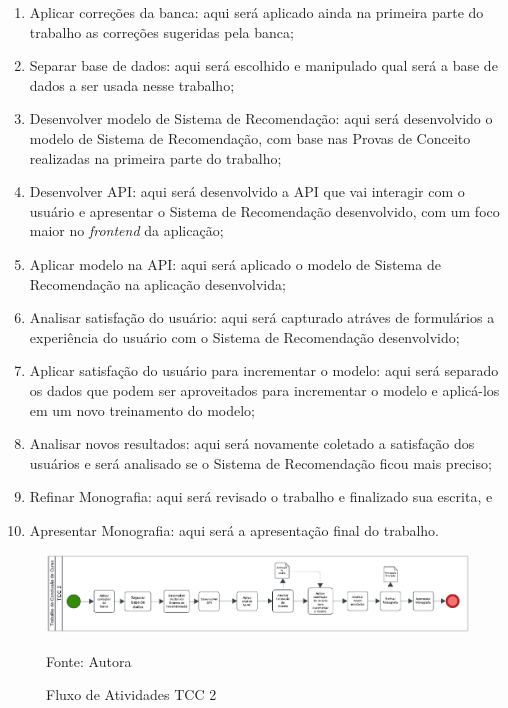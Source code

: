 \begin{enumerate}
    \item Aplicar correções da banca: aqui será aplicado ainda na primeira parte do trabalho as correções sugeridas pela banca;
    \item Separar base de dados: aqui será escolhido e manipulado qual será a base de dados a ser usada nesse trabalho;
    \item Desenvolver modelo de Sistema de Recomendação: aqui será desenvolvido o modelo de Sistema de Recomendação, com base
    nas Provas de Conceito realizadas na primeira parte do trabalho;
    \item Desenvolver API: aqui será desenvolvido a API que vai interagir com o usuário e apresentar o Sistema de Recomendação
    desenvolvido, com um foco maior no \textit{frontend} da aplicação;
    \item Aplicar modelo na API: aqui será aplicado o modelo de Sistema de Recomendação na aplicação desenvolvida;
    \item Analisar satisfação do usuário: aqui será capturado atráves de formulários a experiência do usuário com o Sistema de
    Recomendação desenvolvido;
    \item Aplicar satisfação do usuário para incrementar o modelo: aqui será separado os dados que podem ser aproveitados para
    incrementar o modelo e aplicá-los em um novo treinamento do modelo;
    \item Analisar novos resultados: aqui será novamente coletado a satisfação dos usuários e será analisado se o Sistema 
    de Recomendação ficou mais preciso;
    \item Refinar Monografia: aqui será revisado o trabalho e finalizado sua escrita, e
    \item Apresentar Monografia: aqui será a apresentação final do trabalho.
\end{enumerate}

\begin{figure}[H]
    \centering
    \caption{Fluxo de Atividades TCC 2}
    \label{fig:bpmnTcc2}
    
    \vspace{2pt} %
    
    \includegraphics[width=1.0\textwidth]{figuras/bpmnTcc2.eps}
    
    \vspace{2pt} %
    
    \small Fonte: Autora
\end{figure}

